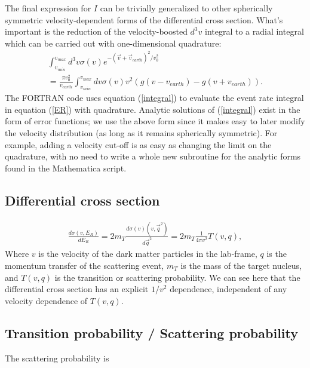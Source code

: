 \documentclass[11pt]{article}
\begin{document}
The final expression for $I$ can be trivially generalized to other spherically
symmetric velocity-dependent forms of the differential cross section. What's 
important is the reduction of the velocity-boosted $d^3v$ integral to a radial 
integral which can be carried out with one-dimensional quadrature:
\begin{equation}\label{integral}
\begin{split}
\int_{v_{min}}^{v_{max}} d^3v \sigma(v) e^{-(\vec{v}+\vec{v}_{earth})^2/v_0^2}
\\
	= \frac{\pi v_0^2}{v_{earth} }\int_{v_{min}}^{v_{max}} dv \sigma(v) v^2\left( g(v-v_{earth}) - g(v+v_{earth}) \right).
\end{split}
\end{equation}
The FORTRAN code uses equation (\ref{integral}) to evaluate the event rate 
integral in equation (\ref{ER}) with quadrature. Analytic solutions of  
(\ref{integral}) exist in the form of error functions; we use the above form 
since it makes easy to later modify the velocity distribution (as long as it 
remains spherically symmetric). For example, adding a velocity cut-off is as 
easy as changing the limit on the quadrature, with no need to write a whole 
new subroutine for the analytic forms found in the Mathematica script.

\subsection{Differential cross section}\label{crosssection}
\begin{equation}
\begin{split}
\frac{d\sigma(v,E_R)}{dE_R} = 2m_T \frac{d\sigma(v)(v,\vec{q}^2)}{d\vec{q}^2} = 2m_T\frac{1}{4\pi v^2}T(v,q),
\end{split}
\end{equation}
Where $v$ is the velocity of the dark matter particles in the lab-frame, $q$ is the momentum transfer of the scattering event, $m_T$ is the mass of the target nucleus, and $T(v,q)$ is the transition or scattering probability. We can see here that the differential cross section has an explicit $1/v^2$ dependence, independent of any velocity dependence of $T(v,q)$.


\subsection{Transition probability / Scattering probability}

The scattering probability is
\end{document}
